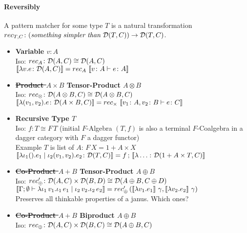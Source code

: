\documentclass[runningheads,envcountsame]{llncs}
\begin{document}
\paragraph*{Reversibly}

A pattern matcher for some type $T$ is a natural transformation $rec_{T, C}\colon (\textit{something simpler than $\mathcal{D}(T, C)$}) \to \mathcal{D}(T, C)$.

\begin{itemize}
    \item \textbf{Variable $v\colon A$} \\
          Iso: $rec_A\colon \mathcal{D}(A, C) \cong \mathcal{D}(A, C)$ \\
          $\sem{\elam{v}{e}\colon \homD{A}{C}} = rec_A\,\sem{v\colon A \vdash e\colon A}$
    \item \textbf{\sout{Product $A \times B$} Tensor-Product $A \otimes B$} \\
          Iso: $rec_{\otimes}\colon \mathcal{D}(A \otimes B, C) \cong \mathcal{D}(A \otimes B, C)$ \\
          $\sem{\elam{\epair{v_1}{v_2}}{e}\colon \homD{A \times B}{C}} = rec_\times\,\sem{v_1\colon A, v_2\colon B \vdash e\colon C}$
    \item \textbf{Recursive Type $T$} \\
          Iso: $f\colon T \cong F\,T$ (initial $F$-Algebra $(T, f)$ is also a terminal $F$-Coalgebra in a dagger category with $F$ a dagger functor) \\
          Example $T$ is list of $A$: $F\,X = 1 + A \times X$ \\
          $\sem{\lambda \iota_1 (). e_1 \mid \iota_2 (v_1, v_2). e_2\colon \homD{T}{C}} = \comp{f}{\sem{\lambda \dots \colon \homD{1 + A \times T}{C}}}$
    \item \textbf{\sout{Co-Product $A + B$} Tensor-Product $A \oplus B$} \\
          Iso: $rec'_{\oplus}\colon \mathcal{D}(A, C) \times \mathcal{D}(B, D) \cong \mathcal{D}(A \oplus B, C \oplus D)$ \\
          $\sem{\Gamma; \emptyset \vdash \lambda \iota_1\,v_1. \iota_1\,e_1 \mid \iota_2\,v_2. \iota_2\,e_2} = rec'_\oplus\,(\sem{\lambda v_1. e_1}\,\gamma, \sem{\lambda v_2. e_2}\,\gamma)$ \\
          Preserves all thinkable properties of a janus. Which ones?
    \item \textbf{\sout{Co-Product $A + B$} Biproduct $A \oplus B$} \\
          Iso: $rec_{\oplus}\colon \mathcal{D}(A, C) \times \mathcal{D}(B, C) \cong \mathcal{D}(A \oplus B, C)$ \\

\end{itemize}
\end{document}
